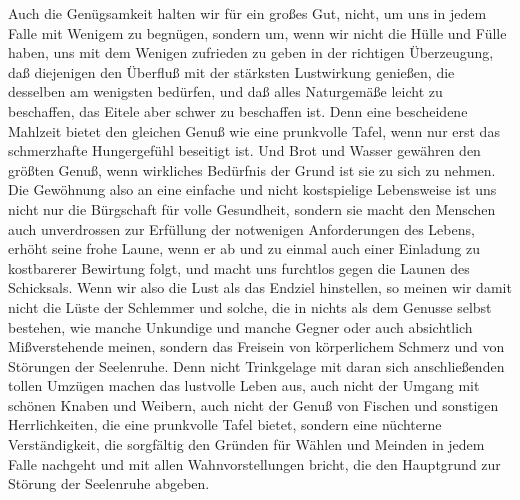 \documentclass{stex}
\begin{document}
Auch die Genügsamkeit halten wir für ein großes Gut, nicht, um uns in jedem Falle mit Wenigem zu begnügen, sondern um, wenn wir nicht die Hülle und Fülle haben, uns mit dem Wenigen zufrieden zu geben in der richtigen Überzeugung, daß diejenigen den Überfluß mit der stärksten Lustwirkung genießen, die desselben am wenigsten bedürfen, und daß alles Naturgemäße leicht zu beschaffen, das Eitele aber schwer zu beschaffen ist.
Denn eine bescheidene Mahlzeit bietet den gleichen Genuß wie eine prunkvolle Tafel, wenn nur erst das schmerzhafte Hungergefühl beseitigt ist.
Und Brot und Wasser gewähren den größten Genuß, wenn wirkliches Bedürfnis der Grund ist sie zu sich zu nehmen.
Die Gewöhnung also an eine einfache und nicht kostspielige Lebensweise ist uns nicht nur die Bürgschaft für volle Gesundheit, sondern sie macht den Menschen auch unverdrossen zur Erfüllung der notwenigen Anforderungen des Lebens, erhöht seine frohe Laune, wenn er ab und zu einmal auch einer Einladung zu kostbarerer Bewirtung folgt, und macht uns furchtlos gegen die Launen des Schicksals.
Wenn wir also die Lust als das Endziel hinstellen, so meinen wir damit nicht die Lüste der Schlemmer und solche, die in nichts als dem Genusse selbst bestehen, wie manche Unkundige und manche Gegner oder auch absichtlich Mißverstehende meinen, sondern das Freisein von körperlichem Schmerz und von Störungen der Seelenruhe.
Denn nicht Trinkgelage mit daran sich anschließenden tollen Umzügen machen das lustvolle Leben aus, auch nicht der Umgang mit schönen Knaben und Weibern, auch nicht der Genuß von Fischen und sonstigen Herrlichkeiten, die eine prunkvolle Tafel bietet, sondern eine nüchterne Verständigkeit, die sorgfältig den Gründen für Wählen und Meinden in jedem Falle nachgeht und mit allen Wahnvorstellungen bricht, die den Hauptgrund zur Störung der Seelenruhe abgeben.
\end{document}
